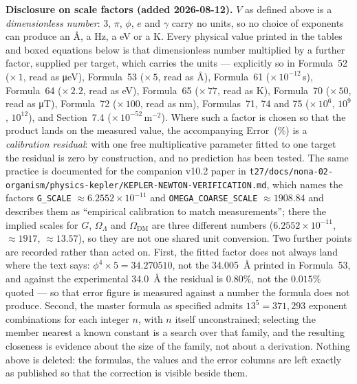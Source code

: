 \documentclass[12pt,a4paper]{article}
\begin{document}
\textbf{Disclosure on scale factors (added 2026-08-12).} $V$ as defined above is a
\emph{dimensionless number}: $3$, $\pi$, $\phi$, $e$ and $\gamma$ carry no units, so no
choice of exponents can produce an \si{\angstrom}, a \si{\hertz}, a \si{\eV} or a
\si{\kelvin}. Every physical value printed in the tables and boxed equations below is that
dimensionless number multiplied by a further factor, supplied per target, which carries the
units --- explicitly so in Formula~52 ($\times\,1$, read as \si{\micro\eV}), Formula~53
($\times\,5$, read as \si{\angstrom}), Formula~61 ($\times\,10^{-12}$\,s), Formula~64
($\times\,2.2$, read as \si{\eV}), Formula~65 ($\times\,77$, read as \si{\kelvin}),
Formula~70 ($\times\,50$, read as \si{\micro\tesla}), Formula~72 ($\times\,100$, read as
\si{\nano\meter}), Formulas~71, 74 and 75 ($\times\,10^{6}$, $10^{9}$, $10^{12}$), and
Section~7.4 ($\times\,10^{-52}\,\mathrm{m}^{-2}$). Where such a factor is chosen so that the
product lands on the measured value, the accompanying Error~(\%) is a \emph{calibration
residual}: with one free multiplicative parameter fitted to one target the residual is zero
by construction, and no prediction has been tested. The same practice is documented for the
companion v10.2 paper in
\texttt{t27/docs/nona-02-organism/physics-kepler/KEPLER-NEWTON-VERIFICATION.md}, which names
the factors \texttt{G\_SCALE} $\approx 6.2552\times10^{-11}$ and
\texttt{OMEGA\_COARSE\_SCALE} $\approx 1908.84$ and describes them as ``empirical
calibration to match measurements''; there the implied scales for $G$, $\Omega_\Lambda$ and
$\Omega_{\text{DM}}$ are three different numbers ($6.2552\times10^{-11}$, ${\approx}1917$,
${\approx}13.57$), so they are not one shared unit conversion. Two further points are
recorded rather than acted on. First, the fitted factor does not always land where the text
says: $\phi^4 \times 5 = 34.270510$, not the \SI{34.005}{\angstrom} printed in Formula~53,
and against the experimental \SI{34.0}{\angstrom} the residual is $0.80\%$, not the
$0.015\%$ quoted --- so that error figure is measured against a number the formula does not
produce. Second, the master formula as specified admits $13^5 = 371{,}293$ exponent
combinations for each integer $n$, with $n$ itself unconstrained; selecting the member
nearest a known constant is a search over that family, and the resulting closeness is
evidence about the size of the family, not about a derivation. Nothing above is deleted:
the formulas, the values and the error columns are left exactly as published so that the
correction is visible beside them.
\end{document}
